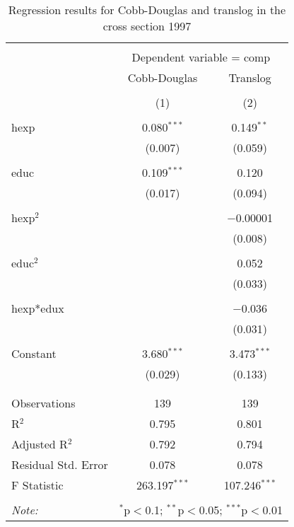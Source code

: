 \documentclass[12pt,a4paper]{article}\usepackage[]{graphicx}\usepackage[]{color}
\begin{document}
\begin{table}[!htbp] \centering 
  \caption{Regression results for Cobb-Douglas and translog in the cross section 1997} 
  \label{tab:func.form} 
\small 
\begin{tabular}{@{\extracolsep{5pt}}lcc} 
\\[-1.8ex]\hline 
\hline \\[-1.8ex] 
 & \multicolumn{2}{c}{Dependent variable = comp} \\ 
\cline{2-3} 
 & Cobb-Douglas & Translog \\ 
\\[-1.8ex] & (1) & (2)\\ 
\hline \\[-1.8ex] 
 hexp & 0.080$^{***}$ & 0.149$^{**}$ \\ 
  & (0.007) & (0.059) \\ 
  & & \\ 
 educ & 0.109$^{***}$ & 0.120 \\ 
  & (0.017) & (0.094) \\ 
  & & \\ 
 hexp$^2$ &  & $-$0.00001 \\ 
  &  & (0.008) \\ 
  & & \\ 
 educ$^2$ &  & 0.052 \\ 
  &  & (0.033) \\ 
  & & \\ 
 hexp*edux &  & $-$0.036 \\ 
  &  & (0.031) \\ 
  & & \\ 
 Constant & 3.680$^{***}$ & 3.473$^{***}$ \\ 
  & (0.029) & (0.133) \\ 
  & & \\ 
\hline \\[-1.8ex] 
Observations & 139 & 139 \\ 
R$^{2}$ & 0.795 & 0.801 \\ 
Adjusted R$^{2}$ & 0.792 & 0.794 \\ 
Residual Std. Error & 0.078 & 0.078 \\ 
F Statistic & 263.197$^{***}$ & 107.246$^{***}$ \\ 
\hline 
\hline \\[-1.8ex] 
\textit{Note:}  & \multicolumn{2}{r}{$^{*}$p$<$0.1; $^{**}$p$<$0.05; $^{***}$p$<$0.01} \\ 
\end{tabular} 
\end{table} 
\end{document}

